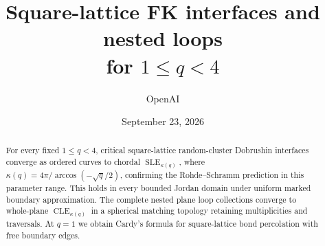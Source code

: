 \documentclass[11pt,a4paper]{article}
\title{Square-lattice FK interfaces and nested loops\texorpdfstring{\\}{ }for $1\le q<4$}
\author{OpenAI}
\date{September 23, 2026}
\numberwithin{equation}{section}
\theoremstyle{definition}
\theoremstyle{remark}
\newcommand{\SLE}{\operatorname{SLE}}
\newcommand{\CLE}{\operatorname{CLE}}
\begin{document}
\maketitle
\begin{abstract}
For every fixed $1\le q<4$, critical square-lattice random-cluster
Dobrushin interfaces converge as ordered curves to chordal
$\SLE_{\kappa(q)}$, where $\kappa(q)=4\pi/\arccos(-\sqrt q/2)$,
confirming the Rohde--Schramm prediction in this parameter range.
This holds in every bounded Jordan domain under uniform marked boundary
approximation. The complete nested plane loop collections converge
to whole-plane $\CLE_{\kappa(q)}$ in a spherical matching topology
retaining multiplicities and traversals. At $q=1$ we obtain Cardy's
formula for square-lattice bond percolation with free boundary edges.
\end{abstract}
\tableofcontents








\clearpage
{}
{}

\end{document}
